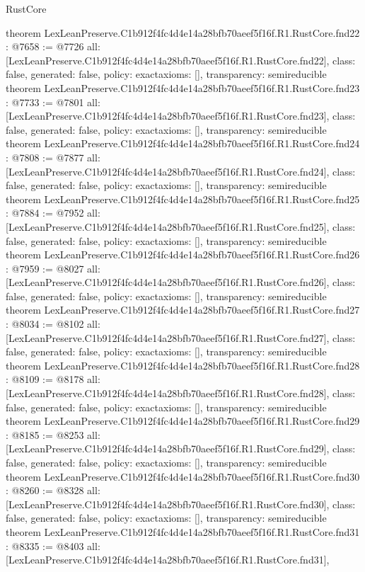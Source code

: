 \begin{lexlean}{RustCore}
\begin{coremodule}
{}
theorem LexLeanPreserve.C1b912f4fc4d4e14a28bfb70aeef5f16f.R1.RustCore.fnd22 : @7658 := @7726 {
  all: [LexLeanPreserve.C1b912f4fc4d4e14a28bfb70aeef5f16f.R1.RustCore.fnd22],
  class: false,
  generated: false,
  policy: exact{axioms: []},
  transparency: semireducible
}
theorem LexLeanPreserve.C1b912f4fc4d4e14a28bfb70aeef5f16f.R1.RustCore.fnd23 : @7733 := @7801 {
  all: [LexLeanPreserve.C1b912f4fc4d4e14a28bfb70aeef5f16f.R1.RustCore.fnd23],
  class: false,
  generated: false,
  policy: exact{axioms: []},
  transparency: semireducible
}
theorem LexLeanPreserve.C1b912f4fc4d4e14a28bfb70aeef5f16f.R1.RustCore.fnd24 : @7808 := @7877 {
  all: [LexLeanPreserve.C1b912f4fc4d4e14a28bfb70aeef5f16f.R1.RustCore.fnd24],
  class: false,
  generated: false,
  policy: exact{axioms: []},
  transparency: semireducible
}
theorem LexLeanPreserve.C1b912f4fc4d4e14a28bfb70aeef5f16f.R1.RustCore.fnd25 : @7884 := @7952 {
  all: [LexLeanPreserve.C1b912f4fc4d4e14a28bfb70aeef5f16f.R1.RustCore.fnd25],
  class: false,
  generated: false,
  policy: exact{axioms: []},
  transparency: semireducible
}
theorem LexLeanPreserve.C1b912f4fc4d4e14a28bfb70aeef5f16f.R1.RustCore.fnd26 : @7959 := @8027 {
  all: [LexLeanPreserve.C1b912f4fc4d4e14a28bfb70aeef5f16f.R1.RustCore.fnd26],
  class: false,
  generated: false,
  policy: exact{axioms: []},
  transparency: semireducible
}
theorem LexLeanPreserve.C1b912f4fc4d4e14a28bfb70aeef5f16f.R1.RustCore.fnd27 : @8034 := @8102 {
  all: [LexLeanPreserve.C1b912f4fc4d4e14a28bfb70aeef5f16f.R1.RustCore.fnd27],
  class: false,
  generated: false,
  policy: exact{axioms: []},
  transparency: semireducible
}
theorem LexLeanPreserve.C1b912f4fc4d4e14a28bfb70aeef5f16f.R1.RustCore.fnd28 : @8109 := @8178 {
  all: [LexLeanPreserve.C1b912f4fc4d4e14a28bfb70aeef5f16f.R1.RustCore.fnd28],
  class: false,
  generated: false,
  policy: exact{axioms: []},
  transparency: semireducible
}
theorem LexLeanPreserve.C1b912f4fc4d4e14a28bfb70aeef5f16f.R1.RustCore.fnd29 : @8185 := @8253 {
  all: [LexLeanPreserve.C1b912f4fc4d4e14a28bfb70aeef5f16f.R1.RustCore.fnd29],
  class: false,
  generated: false,
  policy: exact{axioms: []},
  transparency: semireducible
}
theorem LexLeanPreserve.C1b912f4fc4d4e14a28bfb70aeef5f16f.R1.RustCore.fnd30 : @8260 := @8328 {
  all: [LexLeanPreserve.C1b912f4fc4d4e14a28bfb70aeef5f16f.R1.RustCore.fnd30],
  class: false,
  generated: false,
  policy: exact{axioms: []},
  transparency: semireducible
}
theorem LexLeanPreserve.C1b912f4fc4d4e14a28bfb70aeef5f16f.R1.RustCore.fnd31 : @8335 := @8403 {
  all: [LexLeanPreserve.C1b912f4fc4d4e14a28bfb70aeef5f16f.R1.RustCore.fnd31],
}
\end{coremodule}
\end{lexlean}
